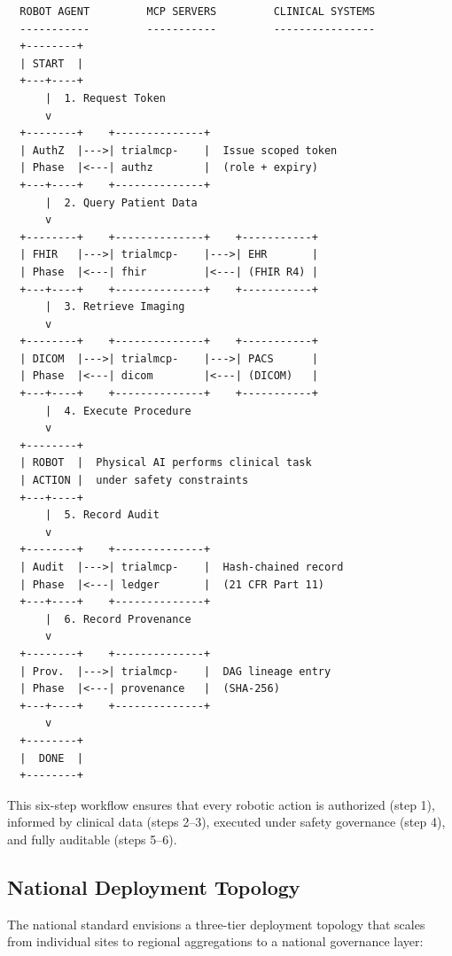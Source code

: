 \documentclass{article}
\begin{document}
\begin{verbatim}
  ROBOT AGENT         MCP SERVERS         CLINICAL SYSTEMS
  -----------         -----------         ----------------
  +--------+
  | START  |
  +---+----+
      |  1. Request Token
      v
  +--------+    +--------------+
  | AuthZ  |--->| trialmcp-    |  Issue scoped token
  | Phase  |<---| authz        |  (role + expiry)
  +---+----+    +--------------+
      |  2. Query Patient Data
      v
  +--------+    +--------------+    +-----------+
  | FHIR   |--->| trialmcp-    |--->| EHR       |
  | Phase  |<---| fhir         |<---| (FHIR R4) |
  +---+----+    +--------------+    +-----------+
      |  3. Retrieve Imaging
      v
  +--------+    +--------------+    +-----------+
  | DICOM  |--->| trialmcp-    |--->| PACS      |
  | Phase  |<---| dicom        |<---| (DICOM)   |
  +---+----+    +--------------+    +-----------+
      |  4. Execute Procedure
      v
  +--------+
  | ROBOT  |  Physical AI performs clinical task
  | ACTION |  under safety constraints
  +---+----+
      |  5. Record Audit
      v
  +--------+    +--------------+
  | Audit  |--->| trialmcp-    |  Hash-chained record
  | Phase  |<---| ledger       |  (21 CFR Part 11)
  +---+----+    +--------------+
      |  6. Record Provenance
      v
  +--------+    +--------------+
  | Prov.  |--->| trialmcp-    |  DAG lineage entry
  | Phase  |<---| provenance   |  (SHA-256)
  +---+----+    +--------------+
      v
  +--------+
  |  DONE  |
  +--------+
\end{verbatim}

This six-step workflow ensures that every robotic action is authorized (step 1), informed by clinical data (steps 2--3), executed under safety governance (step 4), and fully auditable (steps 5--6).

\subsection{National Deployment Topology}

The national standard envisions a three-tier deployment topology that scales from individual sites to regional aggregations to a national governance layer:
\end{document}
